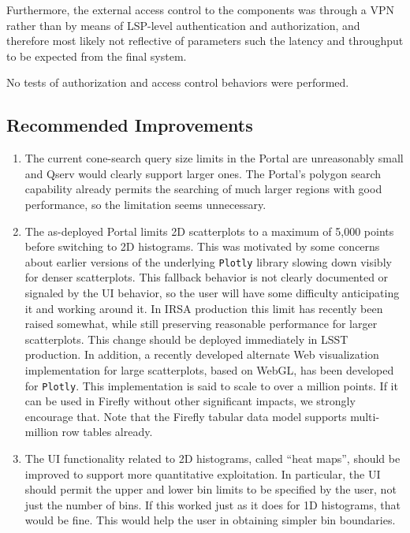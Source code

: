 \documentclass[DM,toc]{lsstdoc}
\begin{document}
Furthermore, the external access control to the components was through a VPN rather than by means of LSP-level authentication and authorization,
and therefore most likely not reflective of parameters such the latency and throughput to be expected from the final system.

No tests of authorization and access control behaviors were performed.


\subsection{Recommended Improvements}
\label{sect:recommendations}

\begin{enumerate}

\item{The current cone-search query size limits in the Portal are unreasonably small and Qserv would clearly support larger ones.
The Portal's polygon search capability already permits the searching of much larger regions with good performance,
so the limitation seems unnecessary.}
\item{The as-deployed Portal limits 2D scatterplots to a maximum of 5,000 points before switching to 2D histograms.
This was motivated by some concerns about earlier versions of the underlying \verb|Plotly| library slowing down visibly for denser scatterplots.
This fallback behavior is not clearly documented or signaled by the UI behavior,
so the user will have some difficulty anticipating it and working around it.
In IRSA production this limit has recently been raised somewhat, while still preserving reasonable performance for larger scatterplots.
This change should be deployed immediately in LSST production.
In addition, a recently developed alternate Web visualization implementation for large scatterplots, based on WebGL, has been developed for \verb|Plotly|.
This implementation is said to scale to over a million points.
If it can be used in Firefly without other significant impacts, we strongly encourage that.
Note that the Firefly tabular data model supports multi-million row tables already.}
\item{The UI functionality related to 2D histograms, called ``heat maps'', should be improved to support more quantitative exploitation.
In particular, the UI should permit the upper and lower bin limits to be specified by the user, not just the number of bins.
If this worked just as it does for 1D histograms, that would be fine.
This would help the user in obtaining simpler bin boundaries.
}
\end{enumerate}
\end{document}
